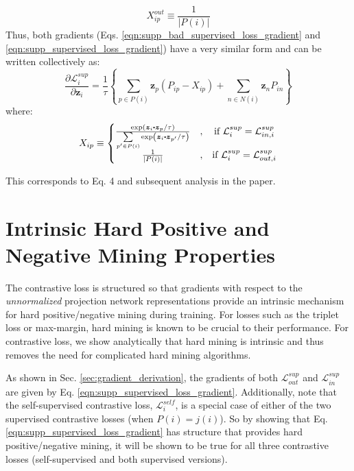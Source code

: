 \begin{equation}
  X_{ip}^{out}\equiv\frac{1}{|P(i)|}
\end{equation}
Thus, both gradients (Eqs. \ref{eqn:supp_bad_supervised_loss_gradient} and \ref{eqn:supp_supervised_loss_gradient}) have a very similar form and can be written collectively as:
\begin{equation}
  \label{eqn:supp_gradient}
  \frac{\partial\mathcal{L}_i^{sup}}{\partial\boldsymbol{z}_i} = \frac{1}{\tau}\left\{
  \sum_{p\in P(i)}\boldsymbol{z}_p(P_{ip}-X_{ip})+
  \sum_{n\in N(i)}\boldsymbol{z}_nP_{in}
  \right\}
\end{equation}
where:
\begin{equation}
  X_{ip}\equiv\left\{
  \begin{matrix}
  \frac{\text{exp}\left(\boldsymbol{z}_i\bigcdot\boldsymbol{z}_p/\tau\right)}{\sum\limits_{p'\in P(i)}\text{exp}\left(\boldsymbol{z}_i\bigcdot\boldsymbol{z}_{p'}/\tau\right)} & , & \text{if }\mathcal{L}_i^{sup}=\mathcal{L}_{in,i}^{sup}\\
  \frac{1}{|P(i)|} & , & \text{if }\mathcal{L}_i^{sup}=\mathcal{L}_{out,i}^{sup}
  \end{matrix}\right.
\end{equation}

This corresponds to Eq. 4 and subsequent analysis in the paper.

\section{Intrinsic Hard Positive and Negative Mining Properties}
\label{sec:hard_mining_properties}
The contrastive loss is structured so that gradients with respect to the \emph{unnormalized} projection network representations provide an intrinsic mechanism for hard positive/negative mining during training. For losses such as the triplet loss or max-margin, hard mining is known to be crucial to their performance. For contrastive loss, we show analytically that hard mining is intrinsic and thus removes the need for complicated hard mining algorithms.

As shown in Sec. \ref{sec:gradient_derivation}, the gradients of both $\mathcal{L}_{out}^{sup}$ and $\mathcal{L}_{in}^{sup}$ are given by Eq. \ref{eqn:supp_supervised_loss_gradient}. Additionally, note that the self-supervised contrastive loss, $\mathcal{L}_i^{self}$, is a special case of either of the two supervised contrastive losses (when $P(i)=j(i)$). So by showing that Eq. \ref{eqn:supp_supervised_loss_gradient} has structure that provides hard positive/negative mining, it will be shown to be true for all three contrastive losses (self-supervised and both supervised versions).

